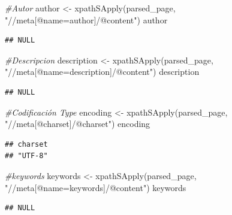 \documentclass[
]{article}
\newenvironment{Shaded}{\begin{snugshade}}{\end{snugshade}}
\newcommand{\CommentTok}[1]{\textcolor[rgb]{0.56,0.35,0.01}{\textit{#1}}}
\newcommand{\FunctionTok}[1]{\textcolor[rgb]{0.00,0.00,0.00}{#1}}
\newcommand{\NormalTok}[1]{#1}
\newcommand{\OtherTok}[1]{\textcolor[rgb]{0.56,0.35,0.01}{#1}}
\newcommand{\StringTok}[1]{\textcolor[rgb]{0.31,0.60,0.02}{#1}}
\begin{document}
\begin{Shaded}
\begin{Highlighting}[]
\CommentTok{\#Autor}
\NormalTok{author }\OtherTok{\textless{}{-}} \FunctionTok{xpathSApply}\NormalTok{(parsed\_page, }\StringTok{"//meta[@name=\textquotesingle{}author\textquotesingle{}]/@content"}\NormalTok{)}
\NormalTok{author}
\end{Highlighting}
\end{Shaded}

\begin{verbatim}
## NULL
\end{verbatim}

\begin{Shaded}
\begin{Highlighting}[]
\CommentTok{\#Descripcion}
\NormalTok{description }\OtherTok{\textless{}{-}} \FunctionTok{xpathSApply}\NormalTok{(parsed\_page, }\StringTok{"//meta[@name=\textquotesingle{}description\textquotesingle{}]/@content"}\NormalTok{)}
\NormalTok{description}
\end{Highlighting}
\end{Shaded}

\begin{verbatim}
## NULL
\end{verbatim}

\begin{Shaded}
\begin{Highlighting}[]
\CommentTok{\#Codificación Type}
\NormalTok{encoding }\OtherTok{\textless{}{-}} \FunctionTok{xpathSApply}\NormalTok{(parsed\_page, }\StringTok{"//meta[@charset]/@charset"}\NormalTok{)}
\NormalTok{encoding}
\end{Highlighting}
\end{Shaded}

\begin{verbatim}
## charset 
## "UTF-8"
\end{verbatim}

\begin{Shaded}
\begin{Highlighting}[]
\CommentTok{\#keywords}
\NormalTok{keywords }\OtherTok{\textless{}{-}} \FunctionTok{xpathSApply}\NormalTok{(parsed\_page, }\StringTok{"//meta[@name=\textquotesingle{}keywords\textquotesingle{}]/@content"}\NormalTok{)}
\NormalTok{keywords}
\end{Highlighting}
\end{Shaded}

\begin{verbatim}
## NULL
\end{verbatim}
\end{document}
